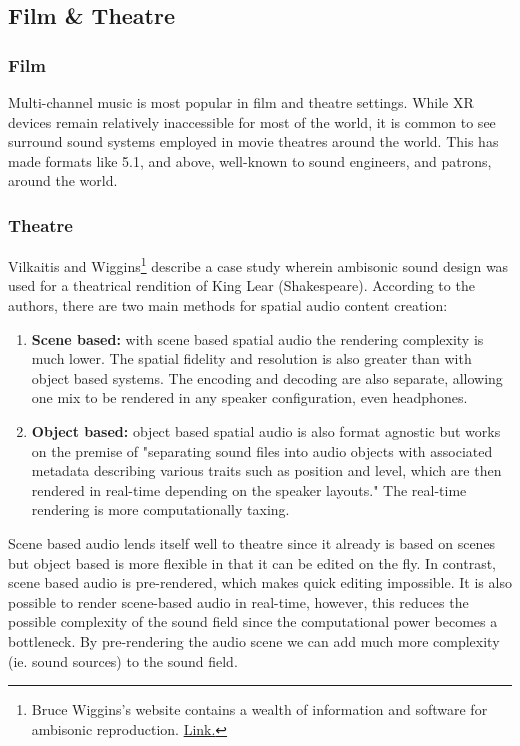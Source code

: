\subsection{Film \& Theatre}

\subsubsection{Film}
Multi-channel music is most popular in film and theatre settings. While XR devices remain relatively inaccessible for most of the world, it is common to see surround sound systems employed in movie theatres around the world. This has made formats like 5.1, and above, well-known to sound engineers, and patrons, around the world. 

\subsubsection{Theatre}

Vilkaitis and Wiggins\footnote{Bruce Wiggins's website contains a wealth of information and software for ambisonic reproduction. \href{https://www.brucewiggins.co.uk/?page_id=78}{Link.}} \cite{vilkaitis2019ambisonic} describe a case study wherein ambisonic sound design was used for a theatrical rendition of King Lear (Shakespeare). According to the authors, there are two main methods for spatial audio content creation:

\begin{enumerate}
    \item \textbf{Scene based:} with scene based spatial audio the rendering complexity is much lower. The spatial fidelity and resolution is also greater than with object based systems. The encoding and decoding are also separate, allowing one mix to be rendered in any speaker configuration, even headphones. 
    \item \textbf{Object based:} object based spatial audio is also format agnostic but works on the premise of "separating sound files into audio objects with  associated metadata describing various traits such as position and level, which are then rendered in real-time depending on the speaker layouts." The real-time rendering is more computationally taxing. 
\end{enumerate}

Scene based audio lends itself well to theatre since it already is based on scenes but object based is more flexible in that it can be edited on the fly. In contrast, scene based audio is pre-rendered, which makes quick editing impossible. It is also possible to render scene-based audio in real-time, however, this reduces the possible complexity of the sound field since the computational power becomes a bottleneck. By pre-rendering the audio scene we can add much more complexity (ie. sound sources) to the sound field. 

